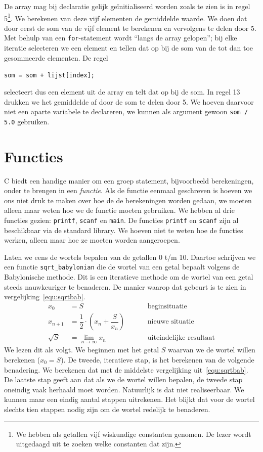 De array mag bij declaratie gelijk geïnitialiseerd worden zoals te zien is in regel 5\footnote{We hebben als getallen vijf wiskundige constanten genomen. De lezer wordt uitgedaagd uit te zoeken welke constanten dat zijn.}. We berekenen van deze vijf elementen de gemiddelde waarde. We doen dat door eerst de som van de vijf element te berekenen en vervolgens te delen door 5. Met behulp van een \texttt{for}-statement wordt ``langs de array gelopen''; bij elke iteratie selecteren we een element en tellen dat op bij de som van de tot dan toe gesommeerde elementen. De regel

\hspace*{1em}\texttt{som = som + lijst[index];}

selecteert dus een element uit de array en telt dat op bij de som. In regel 13 drukken we het gemiddelde af door de som te delen door 5. We hoeven daarvoor niet een aparte variabele te declareren, we kunnen als argument gewoon \texttt{som / 5.0} gebruiken.


\section{Functies}
C biedt een handige manier om een groep statement, bijvoorbeeld berekeningen, onder te brengen in een \textsl{functie}. Als de functie eenmaal geschreven is hoeven we ons niet druk te maken over hoe de de berekeningen worden gedaan, we moeten alleen maar weten hoe we de functie moeten gebruiken. We hebben al drie functies gezien: \texttt{printf}, \texttt{scanf} en \texttt{main}. De functies \texttt{printf} en \texttt{scanf} zijn al beschikbaar via de standard library. We hoeven niet te weten hoe de functies werken, alleen maar hoe ze moeten worden aangeroepen.

Laten we eens de wortels bepalen van de getallen 0 t/m 10. Daartoe schrijven we een functie \texttt{sqrt\_babylonian} die de wortel van een getal bepaalt volgens de Babylonische methode. Dit is een iteratieve methode om de wortel van een getal steeds nauwkeuriger te benaderen. De manier waarop dat gebeurt is te zien in vergelijking~\eqref{equ:sqrtbab}.
%
\begin{equation}
\label{equ:sqrtbab}
\begin{split}
x_0 &= S &&&& \text{beginsituatie} \\
x_{n+1} &= \dfrac{1}{2}\cdot\left(x_n + \dfrac{S}{x_n}\right) &&&& \text{nieuwe situatie}\\
\sqrt{S} &= \lim_{n\rightarrow\infty} x_n &&&& \text{uiteindelijke resultaat}
\end{split}
\end{equation}
%
We lezen dit als volgt. We beginnen met het getal $S$ waarvan we de wortel willen berekenen ($x_0= S$). De tweede, iteratieve stap, is het berekenen van de volgende benadering. We berekenen dat met de middelste vergelijking uit~\eqref{equ:sqrtbab}. De laatste stap geeft aan dat als we de wortel willen bepalen, de tweede stap oneindig vaak herhaald moet worden. Natuurlijk is dat niet realiseerbaar. We kunnen maar een eindig aantal stappen uitrekenen. Het blijkt dat voor de wortel slechts tien stappen nodig zijn om de wortel redelijk te benaderen.

